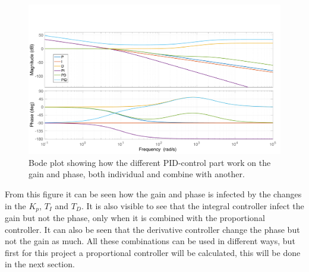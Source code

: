 \begin{figure}[H]
    \centering
    \includegraphics[width=\textwidth]{figures/ch_design/controller/Bodeplot_PID.pdf}
    \caption{Bode plot showing how the different PID-control part work on the gain and phase, both individual and combine with another.}
    \label{fig:PID_bode}
\end{figure}
From this figure it can be seen how the gain and phase is infected by the changes in the $K_p$, $T_I$ and $T_D$. It is also visible to see that the integral controller infect the gain but not the phase, only when it is combined with the proportional controller. 
It can also be seen that the derivative controller change the phase but not the gain as much. All these combinations can be used in different ways, but first for this project a proportional controller will be calculated, this will be done in the next section.

